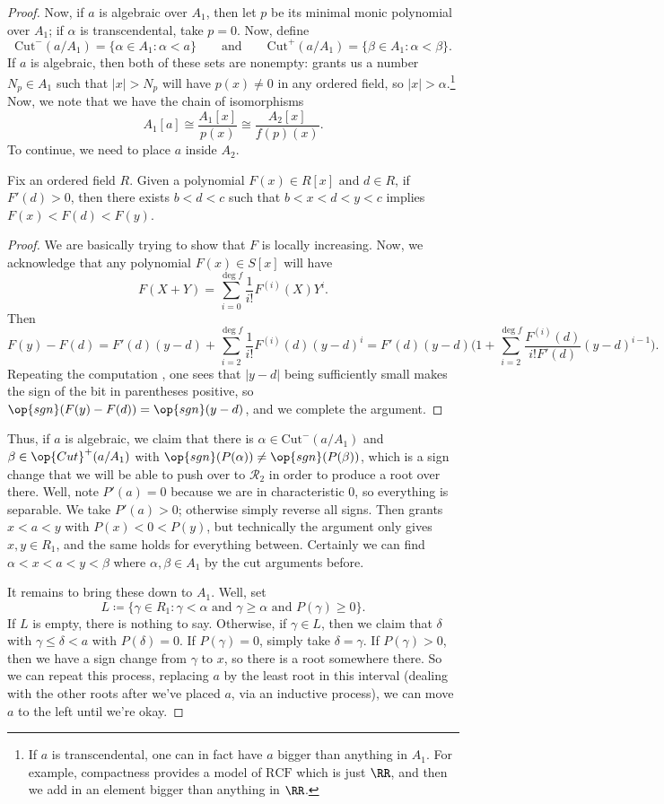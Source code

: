 \documentclass[../notes.tex]{subfiles}
\begin{document}
\begin{proof}
	Now, if $a$ is algebraic over $A_1$, then let $p$ be its minimal monic polynomial over $A_1$; if $\alpha$ is transcendental, take $p=0$. Now, define
	\[\mathrm{Cut}^-(a/A_1)=\{\alpha\in A_1:\alpha<a\}\qquad\text{and}\qquad\mathrm{Cut}^+(a/A_1)=\{\beta\in A_1:\alpha<\beta\}.\]
	If $a$ is algebraic, then both of these sets are nonempty:  grants us a number $N_p\in A_1$ such that $\left|x\right|>N_p$ will have $p(x)\ne0$ in any ordered field, so $\left|x\right|>\alpha$.\footnote{If $a$ is transcendental, one can in fact have $a$ bigger than anything in $A_1$. For example, compactness provides a model of $\mathrm{RCF}$ which is just $\RR$, and then we add in an element bigger than anything in $\RR$.} Now, we note that we have the chain of isomorphisms
	\[A_1[a]\cong\frac{A_1[x]}{p(x)}\cong\frac{A_2[x]}{f(p)(x)}.\]
	To continue, we need to place $a$ inside $A_2$.
	\begin{proposition} \label{prop:poly-increases-locally}
		Fix an ordered field $R$. Given a polynomial $F(x)\in R[x]$ and $d\in R$, if $F'(d)>0$, then there exists $b<d<c$ such that $b<x<d<y<c$ implies $F(x)<F(d)<F(y)$.
	\end{proposition}
	\begin{proof}
		We are basically trying to show that $F$ is locally increasing. Now, we acknowledge that any polynomial $F(x)\in S[x]$ will have
		\[F(X+Y)=\sum_{i=0}^{\deg f}\frac1{i!}F^{(i)}(X)Y^i.\]
		Then
		\[F(y)-F(d)=F'(d)(y-d)+\sum_{i=2}^{\deg f}\frac1{i!}F^{(i)}(d)(y-d)^i=F'(d)(y-d)\Bigg(1+\sum_{i=2}^{\deg f}\frac{F^{(i)}(d)}{i!F'(d)}(y-d)^{i-1}\Bigg).\]
		Repeating the computation , one sees that $\left|y-d\right|$ being sufficiently small makes the sign of the bit in parentheses positive, so $\op{sgn}(F(y)-F(d))=\op{sgn}(y-d)$, and we complete the argument.
	\end{proof}
	Thus, if $a$ is algebraic, we claim that there is $\alpha\in\mathrm{Cut}^-(a/A_1)$ and $\beta\in\op{Cut}^+(a/A_1)$ with $\op{sgn}(P(\alpha))\ne\op{sgn}(P(\beta))$, which is a sign change that we will be able to push over to $\mathcal R_2$ in order to produce a root over there. Well, note $P'(a)=0$ because we are in characteristic $0$, so everything is separable. We take $P'(a)>0$; otherwise simply reverse all signs. Then  grants $x<a<y$ with $P(x)<0<P(y)$, but technically the argument only gives $x,y\in R_1$, and the same holds for everything between. Certainly we can find $\alpha<x<a<y<\beta$ where $\alpha,\beta\in A_1$ by the cut arguments before.

	It remains to bring these down to $A_1$. Well, set
	\[L\coloneqq\{\gamma\in R_1:\gamma<\alpha\text{ and }\gamma\ge\alpha\text{ and }P(\gamma)\ge0\}.\]
	If $L$ is empty, there is nothing to say. Otherwise, if $\gamma\in L$, then we claim that $\delta$ with $\gamma\le\delta<a$ with $P(\delta)=0$. If $P(\gamma)=0$, simply take $\delta=\gamma$. If $P(\gamma)>0$, then we have a sign change from $\gamma$ to $x$, so there is a root somewhere there. So we can repeat this process, replacing $a$ by the least root in this interval (dealing with the other roots after we've placed $a$, via an inductive process), we can move $a$ to the left until we're okay.
\end{proof}
\end{document}
